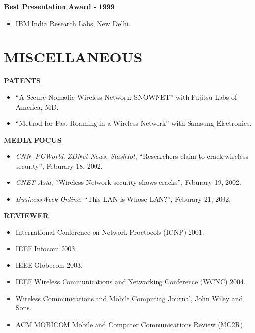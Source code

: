 \begin{resume}
{\bf Best Presentation Award - 1999}
    \begin{itemize}
         \item[] IBM India Research Labs, New Delhi. 
    \end{itemize}

\section{MISCELLANEOUS}
\vspace{0.1in}

{\bf PATENTS}
    \begin{itemize}
         \item[] ``A Secure Nomadic Wireless Network: SNOWNET'' with Fujitsu Labs of America, MD.
	 \item[] ``Method for Fast Roaming in a Wireless Network'' with Samsung Electronics.
    \end{itemize}

{\bf MEDIA FOCUS}
    \begin{itemize}
         \item[] {\em CNN, PCWorld, ZDNet News, Slashdot},  ``Researchers claim to crack
           wireless security'', Feburary 18, 2002.
         \item[] {\em CNET Asia}, ``Wireless Network security shows cracks'', Feburary 19, 2002.  
         \item[] {\em BusinessWeek Online}, ``This LAN is Whose LAN?'', Feburary 21, 2002. 
    \end{itemize}

{\bf REVIEWER} 
    \begin{itemize}
         \item[]  International Conference on Network Proctocols (ICNP) 2001.
         \item[]  IEEE Infocom 2003.
         \item[]  IEEE Globecom 2003.
         \item[]  IEEE Wireless Communications and Networking Conference (WCNC) 2004.
         \item[]  Wireless Communications and Mobile Computing Journal, John Wiley and Sons.
         \item[]  ACM MOBICOM Mobile and Computer Communications Review (MC2R).
    \end{itemize}


\end{resume}

